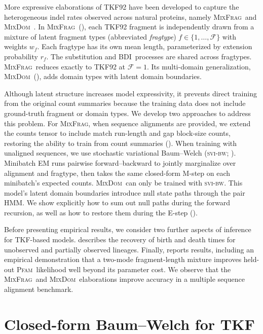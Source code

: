 \documentclass{article}
\newcommand{\MixFrag}{\textsc{MixFrag}}
\newcommand{\MixDom}{\textsc{MixDom}}
\newcommand{\BDI}{\textsc{BDI}}
\newcommand{\Pfam}{\textsc{Pfam}}
\newcommand{\svibw}{\textsc{svi-bw}}
\begin{document}
More expressive elaborations of TKF92 have been developed to capture 
the heterogeneous indel rates observed across natural proteins, 
namely \MixFrag\ and \MixDom~\cite{LargeHolmes2026}.
In \MixFrag\ (), each TKF92 fragment is independently 
drawn from a mixture of latent fragment types (abbreviated \emph{fragtype})
$f\in\{1,\dots,\mathcal{F}\}$ with weights $w_f$. Each fragtype has
its own mean length, parameterized by extension probability $r_f$.
The substitution and \BDI\ processes are shared across fragtypes. 
\MixFrag\ reduces exactly to TKF92 at $\mathcal{F}{=}1$. 
Its multi-domain generalization, \MixDom\ (), 
adds domain types with latent domain boundaries. 

Although latent structure increases model expressivity, it prevents
direct training from the original count summaries because the training
data does not include ground-truth fragment or domain types. We develop
two approaches to address this problem. 
For \MixFrag, when sequence alignments are provided, we extend the counts tensor 
to include match run-length and gap block-size counts, restoring the ability 
to train from count summaries ().
When training with unaligned sequences, we use stochastic variational 
Baum--Welch (\svibw; ). Minibatch EM runs pairwise 
forward--backward to jointly marginalize over alignment and fragtype, 
then takes the same closed-form M-step on each minibatch's expected counts.
\MixDom\ can only be trained with \svibw. This model's latent domain boundaries 
introduce null state paths through the pair HMM.
We show explicitly how to sum out null paths during the forward recursion, as well as 
how to restore them during the E-step ().

Before presenting empirical results, we consider two further
aspects of inference for TKF-based models.
 describes the recovery of birth and death times 
for unobserved and partially observed lineages.
Finally,  reports results, including an
empirical demonstration that a two-mode fragment-length mixture improves
held-out \Pfam\ likelihood well beyond its parameter cost. We observe that the 
\MixFrag\ and \MixDom\ elaborations improve accuracy in a multiple 
sequence alignment benchmark.


\section{Closed-form Baum--Welch for TKF}
\label{sec:tkfem}
\end{document}
